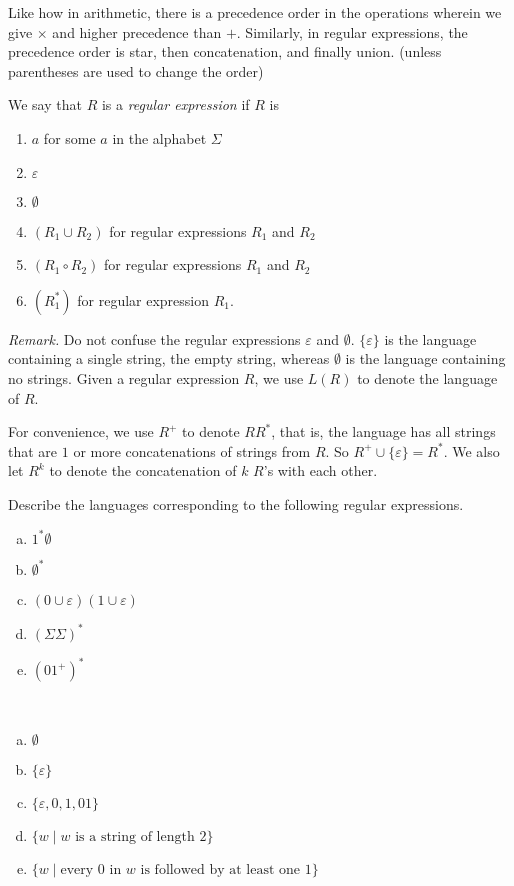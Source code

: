 Like how in arithmetic, there is a precedence order in the operations wherein we give $\times$ and  higher precedence than $+$. Similarly, in regular expressions, the precedence order is star, then concatenation, and finally union. (unless parentheses are used to change the order)

\begin{definition}
We say that $R$ is a \textit{regular expression} if $R$ is
\begin{enumerate}
    \item $a$ for some $a$ in the alphabet $\Sigma$
    \item $\varepsilon$
    \item $\emptyset$
    \item $(R_1\cup R_2)$ for regular expressions $R_1$ and $R_2$
    \item $(R_1\circ R_2)$ for regular expressions $R_1$ and $R_2$
    \item $(R_1^*)$ for regular expression $R_1$.
\end{enumerate}
\end{definition}


\textit{Remark.} Do not confuse the regular expressions $\varepsilon$ and $\emptyset$. $\{\varepsilon\}$ is the language containing a single string, the empty string, whereas $\emptyset$ is the language containing no strings.
\vspace{3mm}
Given a regular expression $R$, we use $L(R)$ to denote the language of $R$.

For convenience, we use $R^+$ to denote $RR^*$, that is, the language has all strings that are $1$ or more concatenations of strings from $R$. So $R^+\cup\{\varepsilon\}=R^*$. We also let $R^k$ to denote the concatenation of $k$ $R$'s  with each other.

\begin{exercise}
Describe the languages corresponding to the following regular expressions.
\begin{enumerate}[(a)]
    \item $1^*\emptyset$
    \item $\emptyset^*$
    \item $(0\cup\varepsilon)(1\cup\varepsilon)$
    \item $(\Sigma\Sigma)^*$
    \item $(01^+)^*$
\end{enumerate}
\end{exercise}
\begin{solution}
~
\begin{enumerate}[(a)]
    \item $\emptyset$
    \item $\{\varepsilon\}$
    \item $\{\varepsilon,0,1,01\}$
    \item $\{w\mid w\text{ is a string of length }2\}$
    \item $\{w\mid \text{every $0$ in $w$ is followed by at least one $1$}\}$
\end{enumerate}
\end{solution}

